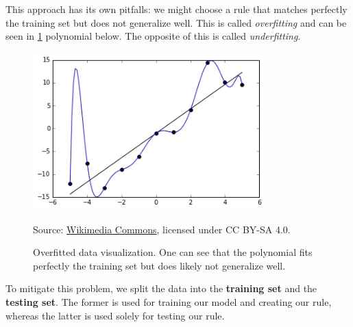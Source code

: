 This approach has its own pitfalls: we might choose a rule that
matches perfectly the training set but does not generalize well. This
is called \textit{overfitting} and can be seen in \ref{fig:overfitting}
polynomial below. The opposite of this is called
\textit{underfitting}.
\begin{figure}[h!]
  \centering
  \includegraphics[width=0.8\textwidth]{figures/ml/overfitted_data.png}
  \caption[Overfitted data visualization]{Overfitted data visualization. One can see that the
    polynomial fits perfectly the training set but does likely not
  generalize well.}
  \begin{minipage}{0.8\textwidth}
    \begin{center}
      \footnotesize
      Source:
      \href{https://commons.wikimedia.org/wiki/File:Overfitted_Data.png}{Wikimedia
      Commons}, licensed under CC BY-SA 4.0.
    \end{center}

  \end{minipage}
  \label{fig:overfitting}
\end{figure}
To mitigate this problem, we split the data into the \textbf{training
set} and the \textbf{testing set}. The former is used for training
our model and creating our rule, whereas the latter is used solely
for testing our rule.
